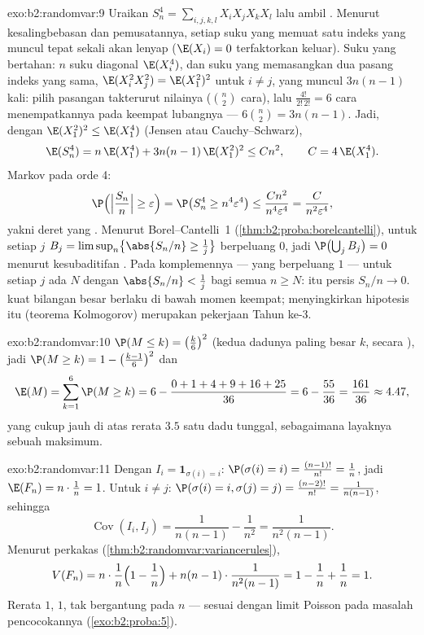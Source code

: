 \begin{solution}{exo:b2:randomvar:9}
Uraikan $S_n^4 = \sum_{i,j,k,l}X_iX_jX_kX_l$ lalu ambil
. Menurut kesalingbebasan dan pemusatannya, setiap suku yang memuat
satu indeks yang muncul tepat sekali akan lenyap ($\E(X_i) = 0$ terfaktorkan
keluar). Suku yang bertahan: $n$ suku diagonal $\E(X_i^4)$, dan
suku yang memasangkan dua pasang indeks yang sama, $\E(X_i^2X_j^2) =
\E(X_1^2)^2$ untuk $i \neq j$, yang muncul $3n(n-1)$ kali: pilih
pasangan takterurut nilainya ($\binom n2$ cara), lalu
$\frac{4!}{2!\,2!} = 6$ cara menempatkannya pada keempat lubangnya ---
$6\binom n2 = 3n(n-1)$. Jadi, dengan $\E(X_1^2)^2
\leq \E(X_1^4)$ (Jensen atau Cauchy--Schwarz),
\[
\E(S_n^4) = n\,\E(X_1^4) + 3n(n-1)\,\E(X_1^2)^2
\leq C n^2,
\qquad C = 4\,\E(X_1^4) .
\]
Markov pada orde 4:
\[
\P\Bigl(\Bigl|\frac{S_n}{n}\Bigr| \geq \varepsilon\Bigr)
= \P\bigl(S_n^4 \geq n^4\varepsilon^4\bigr)
\leq \frac{Cn^2}{n^4\varepsilon^4}
= \frac{C}{n^2\varepsilon^4} ,
\]
yakni deret yang . Menurut Borel--Cantelli~1
(\cref{thm:b2:proba:borelcantelli}), untuk setiap $j$ 
$B_j = \limsup_n\bigl\{\abs{S_n/n} \geq \frac1j\bigr\}$ berpeluang
$0$, jadi $\P\bigl(\bigcup_j B_j\bigr) = 0$ menurut kesubaditifan
. Pada komplemennya --- yang berpeluang $1$
--- untuk setiap $j$ ada $N$ dengan $\abs{S_n/n} < \frac1j$ bagi
semua $n \geq N$: itu persis $S_n/n \to 0$.  kuat bilangan
besar berlaku di bawah momen keempat; menyingkirkan hipotesis itu
(teorema Kolmogorov) merupakan pekerjaan Tahun ke-3.
\end{solution}

\begin{solution}{exo:b2:randomvar:10}
$\P(M \leq k) = \bigl(\frac k6\bigr)^2$ (kedua dadunya paling besar
$k$, secara ), jadi $\P(M \geq k) = 1 -
\bigl(\frac{k-1}6\bigr)^2$ dan
\[
\E(M) = \sum_{k=1}^6\P(M \geq k)
= 6 - \frac{0 + 1 + 4 + 9 + 16 + 25}{36}
= 6 - \frac{55}{36} = \frac{161}{36} \approx 4.47 ,
\]
yang cukup jauh di atas rerata $3.5$ satu dadu tunggal, sebagaimana
layaknya sebuah maksimum.
\end{solution}

\begin{solution}{exo:b2:randomvar:11}
Dengan $I_i = \mathbf 1_{\sigma(i) = i}$: $\P(\sigma(i) = i) =
\frac{(n-1)!}{n!} = \frac1n$, jadi $\E(F_n) = n\cdot\frac1n =
1$. Untuk $i \neq j$: $\P(\sigma(i) = i, \sigma(j) = j) =
\frac{(n-2)!}{n!} = \frac1{n(n-1)}$, sehingga
\[
\operatorname{Cov}(I_i, I_j) = \frac1{n(n-1)} - \frac1{n^2}
= \frac{1}{n^2(n-1)} .
\]
Menurut perkakas 
(\cref{thm:b2:randomvar:variancerules}),
\[
V(F_n) = n\cdot\frac1n\Bigl(1 - \frac1n\Bigr)
+ n(n-1)\cdot\frac1{n^2(n-1)}
= 1 - \frac1n + \frac1n = 1 .
\]
Rerata $1$,  $1$, tak bergantung pada $n$ --- sesuai
dengan limit Poisson pada masalah pencocokannya
(\cref{exo:b2:proba:5}).
\end{solution}

